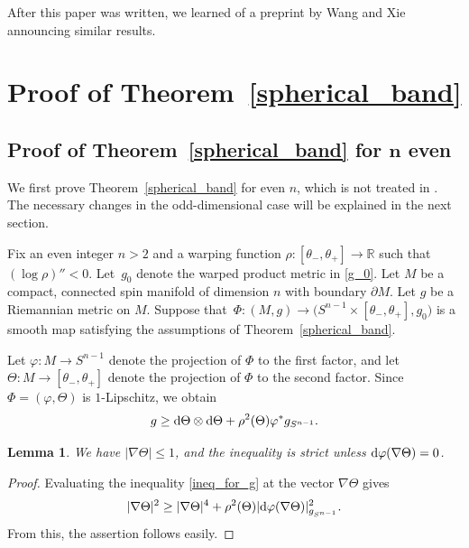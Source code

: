 \documentclass[pdftex]{sigma}
\numberwithin{equation}{section}
\newtheorem{Lemma}[Theorem]{Lemma}
\newcommand{\R}{\mathbb{R}}
\begin{document}
After this paper was written, we learned of a preprint by Wang and Xie \cite{Wang-Xie} announcing similar results.

\section{Proof of Theorem~\ref{spherical_band}}\label{proof_of_band_comparison}

\subsection[Proof of Theorem~\ref{spherical_band} for n even]{Proof of Theorem~\ref{spherical_band} for $\boldsymbol{n}$ even}

We first prove Theorem~\ref{spherical_band} for even $n$, which is not treated in \cite{Cecchini-Zeidler}.
The necessary changes in the odd-dimensional case will be explained in the next section.

Fix an even integer $n>2$ and a warping function $\rho\colon [\theta_- , \theta_+] \to \R$ such that $(\log \rho)''<0$.
Let~$g_0$ denote the warped product metric in \eqref{g_0}.
Let $M$ be a compact, connected spin manifold of dimension $n$ with boundary $\partial M$.
Let $g$ be a Riemannian metric on $M$.
Suppose that~${\Phi\colon (M,g) \to \big(S^{n-1} \times [\theta_-,\theta_+],g_0\big)}$ is a smooth map satisfying the assumptions of Theorem~\ref{spherical_band}.

Let $\varphi\colon M \to S^{n-1}$ denote the projection of $\Phi$ to the first factor, and let $\Theta\colon M \to [\theta_-,\theta_+]$ denote the projection of $\Phi$ to the second factor. Since $\Phi = (\varphi,\Theta)$ is $1$-Lipschitz, we obtain
\begin{equation} \label{ineq_for_g}
 g \geq {\rm d}\Theta \otimes {\rm d}\Theta + \rho^2(\Theta) \varphi^* g_{S^{n-1}}.
\end{equation}

\begin{Lemma}
\label{gradient_of_Theta}
We have $|\nabla \Theta| \leq 1$, and the inequality is strict unless ${\rm d}\varphi(\nabla \Theta) = 0$.
\end{Lemma}

\begin{proof}
Evaluating the inequality \eqref{ineq_for_g} at the vector $\nabla \Theta$ gives
\[|\nabla \Theta|^2 \geq |\nabla \Theta|^4 + \rho^2(\Theta) |{\rm d}\varphi(\nabla \Theta)|_{g_{S^{n-1}}}^2.\]
From this, the assertion follows easily.
\end{proof}
\end{document}
